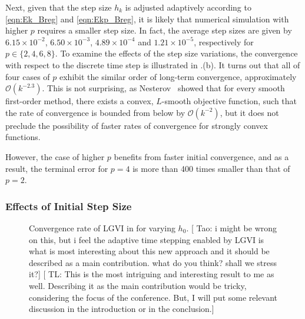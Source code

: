 \documentclass[letterpaper, 10pt, conference]{ieeeconf}
\newcommand{\tao}[1]{[{\color{blue} Tao: #1}]}
\newcommand{\EditTL}[1]{[{\color{red} TL: #1}]}
\begin{document}
Next, given that the step size $h_k$ is adjusted adaptively according to \eqref{eqn:Ek_Breg} and \eqref{eqn:Ekp_Breg}, it is likely that numerical simulation with higher $p$ requires a smaller step size. 
In fact, the average step sizes are given by $6.15\times10^{-2}$, $6.50\times 10^{-3}$, $4.89\times10^{-4}$ and $1.21\times 10^{-5}$, respectively for $p\in\{2,4,6,8\}$. 
To examine the effects of the step size variations, the convergence with respect to the discrete time step is illustrated in .(b).
It turns out that all of four cases of $p$ exhibit the similar order of long-term convergence, approximately $\mathcal{O}(k^{-2.3})$. This is not surprising, as Nesterov~\cite{nesterov2003introductory} showed that for every smooth first-order method, there exists a convex, $L$-smooth objective function, such that the rate of convergence is bounded from below by $\mathcal{O}(k^{-2})$, but it does not preclude the possibility of faster rates of convergence for strongly convex functions.

However, the case of higher $p$ benefits from faster initial convergence, and as a result, the terminal error for $p=4$ is more than 400 times smaller than that of $p=2$.

\subsubsection{Effects of Initial Step Size}

\begin{figure}
    \centerline{
    }
    \centerline{
    }
    \caption{Convergence rate of LGVI in  for varying $h_0$. \tao{i might be wrong on this, but i feel the adaptive time stepping enabled by LGVI is what is most interesting about this new approach and it should be described as a main contribution. what do you think? shall we stress it?} \EditTL{This is the most intriguing and interesting result to me as well. Describing it as the main contribution would be tricky, considering the focus of the conference. But, I will put some relevant discussion in the introduction or in the conclusion.} } \label{fig:conv_h}
\end{figure}
\end{document}
